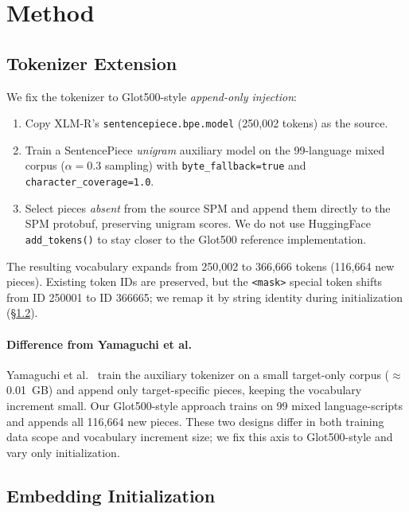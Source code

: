 \section{Method}

\subsection{Tokenizer Extension}

We fix the tokenizer to Glot500-style \emph{append-only injection}:
\begin{enumerate}
  \item Copy XLM-R's \texttt{sentencepiece.bpe.model} (250,002 tokens) as the source.
  \item Train a SentencePiece \emph{unigram} auxiliary model on the 99-language mixed
        corpus ($\alpha=0.3$ sampling) with \texttt{byte\_fallback=true} and
        \texttt{character\_coverage=1.0}.
  \item Select pieces \emph{absent} from the source SPM and append them directly to the
        SPM protobuf, preserving unigram scores.
        We do not use HuggingFace \texttt{add\_tokens()} to stay closer to the Glot500
        reference implementation.
\end{enumerate}

The resulting vocabulary expands from 250,002 to 366,666 tokens (116,664 new pieces).
Existing token IDs are preserved, but the \verb|<mask>| special token shifts from ID 250001
to ID 366665; we remap it by string identity during initialization (\S\ref{subsec:init}).

\paragraph{Difference from Yamaguchi et al.}
Yamaguchi et al.\ \citep{yamaguchi2025vocab} train the auxiliary tokenizer on a small
target-only corpus ($\approx$0.01~GB) and append only target-specific pieces, keeping
the vocabulary increment small.
Our Glot500-style approach trains on 99 mixed language-scripts and appends all 116,664
new pieces.
These two designs differ in both training data scope and vocabulary increment size;
we fix this axis to Glot500-style and vary only initialization.

\subsection{Embedding Initialization}
\label{subsec:init}

